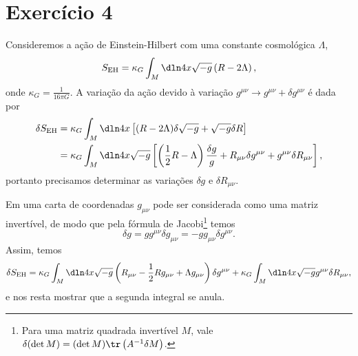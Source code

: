 \section*{Exercício 4}
Consideremos a ação de Einstein-Hilbert com uma constante cosmológica \(\Lambda\),
\begin{equation*}
    S_{\mathrm{EH}} = \kappa_G \int_M\dln4x\sqrt{-g}\left(R - 2\Lambda\right),
\end{equation*}
onde \(\kappa_G = \frac{1}{16\pi G}\). A variação da ação devido à variação \(g^{\mu\nu} \to g^{\mu\nu} + \delta g^{\mu\nu}\) é dada por
\begin{align*}
    \delta S_\mathrm{EH} &= \kappa_G \int_M\dln4x\left[(R-2\Lambda)\delta\sqrt{-g} + \sqrt{-g}\delta R\right]\\
                         &= \kappa_G \int_M\dln4x\sqrt{-g}\left[\left(\frac12 R-\Lambda\right)\frac{\delta{g}}{g} + R_{\mu\nu}\delta g^{\mu\nu} + g^{\mu\nu}\delta R_{\mu\nu}\right],
\end{align*}
portanto precisamos determinar as variações \(\delta g\) e \(\delta R_{\mu\nu}\).

Em uma carta de coordenadas \(g_{\mu\nu}\) pode ser considerada como uma matriz invertível, de modo que pela fórmula de Jacobi\footnote{Para uma matriz quadrada invertível \(M\), vale \(\delta(\det{M}) = (\det{M})\tr\left(A^{-1}\delta M\right)\).} temos
\begin{equation*}
    \delta g = g g^{\mu\nu}\delta g_{\mu\nu} = - g g_{\mu\nu} \delta g^{\mu\nu}.
\end{equation*}
Assim, temos
\begin{equation*}
    \delta S_\mathrm{EH} = \kappa_G \int_M \dln4x \sqrt{-g} \left(R_{\mu\nu} - \frac12 Rg_{\mu\nu} + \Lambda g_{\mu\nu}\right)\delta g^{\mu\nu} + \kappa_G \int_M\dln4x \sqrt{-g}g^{\mu\nu} \delta R_{\mu\nu},
\end{equation*}
e nos resta mostrar que a segunda integral se anula.

